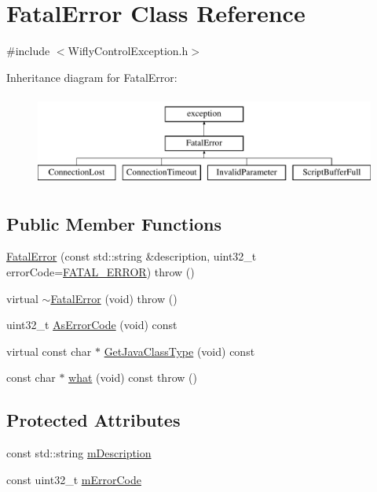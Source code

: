 \hypertarget{class_fatal_error}{\section{Fatal\-Error Class Reference}
\label{class_fatal_error}
}


{\ttfamily \#include $<$Wifly\-Control\-Exception.\-h$>$}

Inheritance diagram for Fatal\-Error\-:\begin{figure}[H]
\begin{center}
\leavevmode
\includegraphics[height=3.000000cm]{class_fatal_error}
\end{center}
\end{figure}
\subsection*{Public Member Functions}
\begin{DoxyCompactItemize}
\item 
\hyperlink{class_fatal_error_ab005fe4973271bbb4fd6d93b4276e032}{Fatal\-Error} (const std\-::string \&description, uint32\-\_\-t error\-Code=\hyperlink{_wifly_control_exception_8h_a35f87aeba08c4e366afd2fe914d231d2a9ea7cd44f3b5993c0b647366d8ff725e}{F\-A\-T\-A\-L\-\_\-\-E\-R\-R\-O\-R})  throw ()
\item 
virtual \hyperlink{class_fatal_error_ad3efb05890de21cb4e0e0b548c2eb6be}{$\sim$\-Fatal\-Error} (void)  throw ()
\item 
uint32\-\_\-t \hyperlink{class_fatal_error_aff5d3bf2e203cd489572faacbef89877}{As\-Error\-Code} (void) const 
\item 
virtual const char $\ast$ \hyperlink{class_fatal_error_a1da7871292d9c49e20a47642367796d1}{Get\-Java\-Class\-Type} (void) const 
\item 
const char $\ast$ \hyperlink{class_fatal_error_ab99c115b0c87a911b6bf725c086eb646}{what} (void) const   throw ()
\end{DoxyCompactItemize}
\subsection*{Protected Attributes}
\begin{DoxyCompactItemize}
\item 
const std\-::string \hyperlink{class_fatal_error_a02622271122ba8f87fea8b7f78e8ba0d}{m\-Description}
\item 
const uint32\-\_\-t \hyperlink{class_fatal_error_a37d3c3b085afb40a682e4233ce63639f}{m\-Error\-Code}
\end{DoxyCompactItemize}
